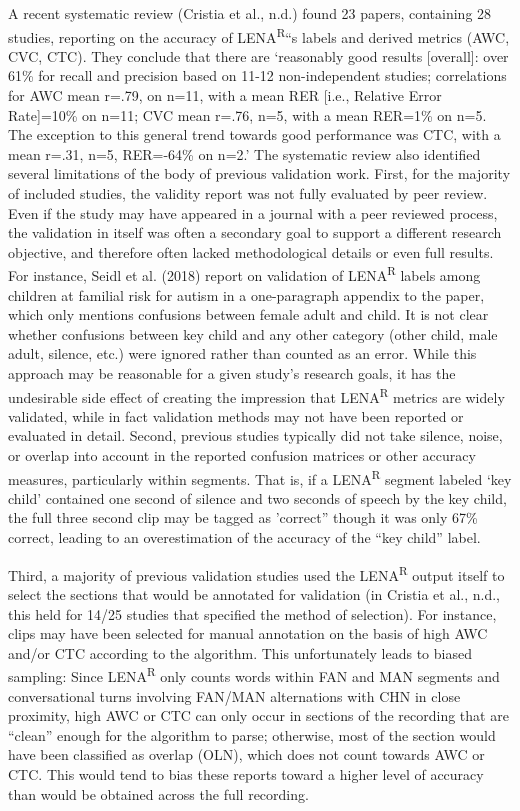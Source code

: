 \documentclass[english,table,man,floatsintext]{apa6}
\begin{document}
A recent systematic review (Cristia et al., n.d.) found 23 papers, containing 28 studies, reporting on the accuracy of LENA\textsuperscript{R}\enquote{s labels and derived metrics (AWC, CVC, CTC). They conclude that there are \enquote{reasonably good results {[}overall{]}: over 61\% for recall and precision based on 11-12 non-independent studies; correlations for AWC mean r=.79, on n=11, with a mean RER {[}i.e., Relative Error Rate{]}=10\% on n=11; CVC mean r=.76, n=5, with a mean RER=1\% on n=5. The exception to this general trend towards good performance was CTC, with a mean r=.31, n=5, RER=-64\% on n=2.} The systematic review also identified several limitations of the body of previous validation work. First, for the majority of included studies, the validity report was not fully evaluated by peer review. Even if the study may have appeared in a journal with a peer reviewed process, the validation in itself was often a secondary goal to support a different research objective, and therefore often lacked methodological details or even full results. For instance, Seidl et al. (2018) report on validation of LENA\textsuperscript{R} labels among children at familial risk for autism in a one-paragraph appendix to the paper, which only mentions confusions between female adult and child. It is not clear whether confusions between key child and any other category (other child, male adult, silence, etc.) were ignored rather than counted as an error. While this approach may be reasonable for a given study's research goals, it has the undesirable side effect of creating the impression that LENA\textsuperscript{R} metrics are widely validated, while in fact validation methods may not have been reported or evaluated in detail.
Second, previous studies typically did not take silence, noise, or overlap into account in the reported confusion matrices or other accuracy measures, particularly within segments. That is, if a LENA\textsuperscript{R} segment labeled \enquote{key child} contained one second of silence and two seconds of speech by the key child, the full three second clip may be tagged as 'correct} though it was only 67\% correct, leading to an overestimation of the accuracy of the \enquote{key child} label.

Third, a majority of previous validation studies used the LENA\textsuperscript{R} output itself to select the sections that would be annotated for validation (in Cristia et al., n.d., this held for 14/25 studies that specified the method of selection). For instance, clips may have been selected for manual annotation on the basis of high AWC and/or CTC according to the algorithm. This unfortunately leads to biased sampling: Since LENA\textsuperscript{R} only counts words within FAN and MAN segments and conversational turns involving FAN/MAN alternations with CHN in close proximity, high AWC or CTC can only occur in sections of the recording that are \enquote{clean} enough for the algorithm to parse; otherwise, most of the section would have been classified as overlap (OLN), which does not count towards AWC or CTC. This would tend to bias these reports toward a higher level of accuracy than would be obtained across the full recording.
\end{document}

